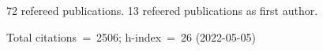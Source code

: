 72 refereed publications. 13 refeered publications as first author.

Total citations~=~2506; h-index~=~26 (2022-05-05)